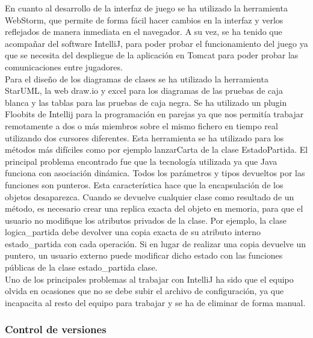 En cuanto al desarrollo de la interfaz de juego se ha utilizado la herramienta WebStorm, que permite de forma fácil hacer cambios en la interfaz y verlos reflejados de manera inmediata en el navegador. A su vez, se ha tenido que acompañar del software IntelliJ, para poder probar el funcionamiento del juego ya que se necesita del despliegue de la aplicación en Tomcat para poder probar las comunicaciones entre jugadores.
\\
Para el diseño de los diagramas de clases se ha utilizado la herramienta StarUML, la web draw.io y excel para los diagramas de las pruebas de caja blanca y las tablas para las pruebas de caja negra.
Se ha utilizado un plugin Floobits de Intellij para la programación en parejas ya que nos permitía trabajar remotamente a dos o más miembros sobre el mismo fichero en tiempo real utilizando dos cursores diferentes. Esta herramienta se ha utilizado para los métodos más difíciles como por ejemplo lanzarCarta de la clase EstadoPartida.
El principal problema encontrado fue que la tecnología utilizada ya que Java funciona con asociación dinámica. Todos los parámetros y tipos devueltos por las funciones son punteros. Esta característica hace que la encapsulación de los objetos desaparezca. Cuando se devuelve cualquier clase como resultado de un método, es necesario crear una replica exacta del objeto en memoria, para que el usuario no modifique los atributos privados de la clase. Por ejemplo, la clase logica\_partida debe devolver una copia exacta de su atributo interno estado\_partida con cada operación. Si en lugar de realizar una copia devuelve un puntero, un usuario externo puede modificar dicho estado con las funciones públicas de la clase estado\_partida clase.
\\
Uno de los principales problemas al trabajar con IntelliJ ha sido que el equipo olvida en ocasiones que no se debe subir el archivo de configuración, ya que incapacita al resto del equipo para trabajar y se ha de eliminar de forma manual.

\subsubsection{Control de versiones}
